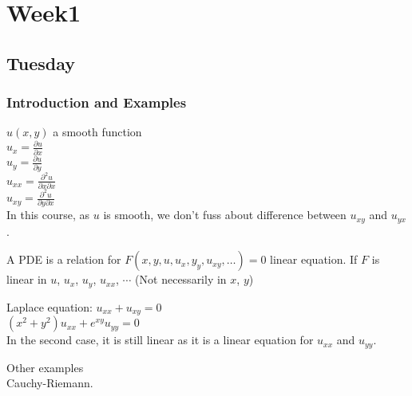 
\chapter{Week1}

\section{Tuesday}
\subsection{Introduction and Examples}
$u(x,y)$ a smooth function\\
$u_x=\frac{\partial u}{\partial x}$\\
$u_y=\frac{\partial u}{\partial y}$\\
$u_{xx}=\frac{\partial ^2u}{\partial x\partial x}$\\
$u_{xy}=\frac{\partial ^2u}{\partial y\partial x}$\\
In this course, as $u$ is smooth, we don't fuss about difference between $u_{xy}$ and $u_{yx}$.\\
\begin{definition}
A PDE is a relation for $F(x,y,u,u_x,y_y,u_{xy},\dots)=0$
linear equation.  If $F$ is linear in $u$, $u_x$, $u_y$, $u_{xx}$, $\cdots$ (Not necessarily in $x$, $y$)
\end{definition}

\begin{example}
Laplace equation: $u_{xx} + u_{xy} = 0$\\
$( x^2 + y^2 ) u_{xx} + e^{xy} u_{yy} = 0$\\
In the second case, it is still linear as it is a linear equation for $u_{xx}$ and $u_{yy}$. 
\end{example}
Other examples\\
Cauchy-Riemann.\\

